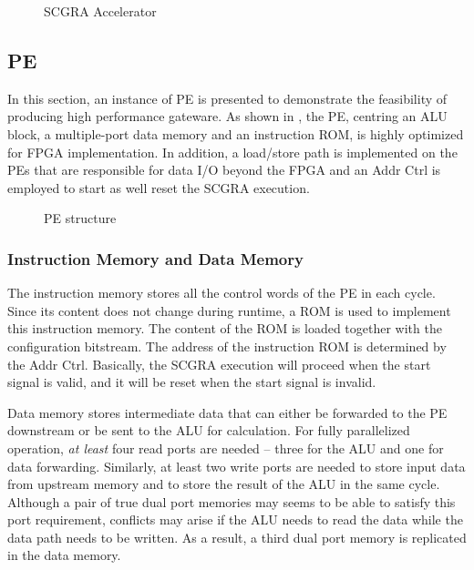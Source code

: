 \begin{figure}[h]
    \caption{SCGRA Accelerator}
    \label{fig:scgra-accelerator}
\end{figure}

\subsection{PE}
In this section, an instance of PE is presented to demonstrate the feasibility of producing high performance gateware. As shown in , the PE, centring an ALU block, a multiple-port data memory and an instruction ROM, is highly optimized for FPGA implementation. In addition, a load/store path is implemented on the PEs that are responsible for data I/O beyond the FPGA and an Addr Ctrl is employed to start as well reset the SCGRA execution.

\begin{figure}[h]
\center{\texttt{[image: pe]}}
\caption{PE structure}
\label{fig:pe}
\end{figure}

\subsubsection{Instruction Memory and Data Memory}
The instruction memory stores all the control words of the PE in each cycle. Since its content does not change during runtime, a ROM is used to implement this instruction memory. The content of the ROM is loaded together with the configuration bitstream. The address of the instruction ROM is determined by the Addr Ctrl. Basically, the SCGRA execution will proceed when the start signal is valid, and it will be reset when the start signal is invalid.

Data memory stores intermediate data that can either be forwarded to the PE downstream or be sent to the ALU for calculation. For fully parallelized operation, \emph{at least} four read ports are needed -- three for the ALU and one for data forwarding. Similarly, at least two write ports are needed to store input data from upstream memory and to store the result of the ALU in the same cycle. Although a pair of true dual port memories may seems to be able to satisfy this port requirement, conflicts may arise if the ALU needs to read the data while the data path needs to be written. As a result, a third dual port memory is replicated in the data memory.

